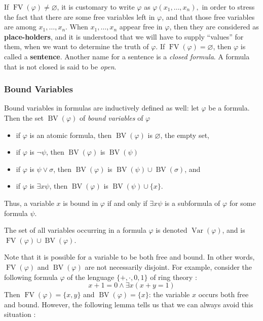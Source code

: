 \documentclass[12pt]{article}
\renewcommand{\And}{\wedge}
\begin{document}
If $\operatorname{FV}(\varphi) \ne \varnothing$, it is customary to write $\varphi$ as $\varphi(x_1,\ldots, x_n),$ in order to stress the fact that there are some free variables left in $\varphi$, and that those free variables are among $x_1,\ldots, x_n$.  When $x_1, \ldots, x_n$ appear free in $\varphi$, then they are considered as {\bf place-holders}, and it is understood that we will have to supply ``values'' for them, when we want to determine the truth of $\varphi$. If $\operatorname{FV}(\varphi)=\varnothing$, then $\varphi$ is called a {\bf sentence}.  Another name for a sentence is a \emph{closed formula}.  A formula that is not closed is said to be \emph{open}.

\subsubsection*{Bound Variables}

Bound variables in formulas are inductively defined as well: let $\varphi$ be a formula.  Then the set $\operatorname{BV}(\varphi)$ of \emph{bound variables} of $\varphi$
\begin{itemize}
\item if $\varphi$ is an atomic formula, then $\operatorname{BV}(\varphi)$ is $\varnothing$, the empty set,
\item if $\varphi$ is $\neg \psi$, then $\operatorname{BV}(\varphi)$ is $\operatorname{BV}(\psi)$
\item if $\varphi$ is $\psi \vee \sigma$, then $\operatorname{BV}(\varphi)$ is $\operatorname{BV}(\psi) \cup \operatorname{BV}(\sigma)$, and
\item if $\varphi$ is $\exists x \psi$, then $\operatorname{BV}(\varphi)$ is $\operatorname{BV}(\psi) \cup \lbrace x \rbrace$.
\end{itemize}
Thus, a variable $x$ is bound in $\varphi$ if and only if $\exists x\psi$ is a subformula of $\varphi$ for some formula $\psi$.

The set of all variables occurring in a formula $\varphi$ is denoted $\operatorname{Var}(\varphi)$, and is $\operatorname{FV}(\varphi)\cup \operatorname{BV}(\varphi)$.

Note that it is possible for a variable to be both free and bound.  In other words, $\operatorname{FV}(\varphi)$ and $\operatorname{BV}(\varphi)$ are not necessarily disjoint.  For example, consider the following formula $\varphi$ of the lenguage $\{+,\cdot,0,1\}$ of ring theory :
\begin{displaymath}
x+1=0\And\exists x(x+y=1)
\end{displaymath}
Then $\operatorname{FV}(\varphi)=\lbrace x,y\rbrace$ and $\operatorname{BV}(\varphi)=\lbrace x\rbrace$: the variable $x$ occurs both free and bound.  However, the following lemma tells us that we can always avoid this situation :
\end{document}
